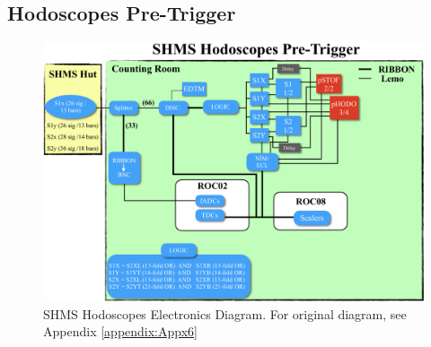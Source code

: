\documentclass[11pt]{article}
\begin{document}
\subsection{Hodoscopes Pre-Trigger}
\begin{figure}[h!]
  \centering
  \includegraphics[scale=0.5]{pHODO_diagram.png}
  \caption{SHMS Hodoscopes Electronics Diagram. For original diagram, see Appendix \ref{appendix:Appx6}}
  \label{fig:pHODO_diagram}
\end{figure}
\end{document}

